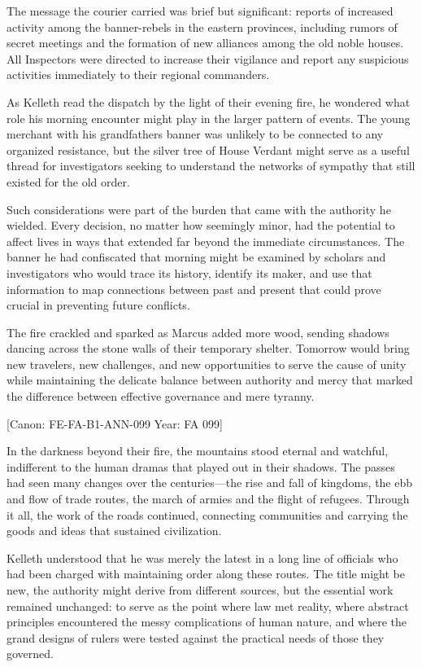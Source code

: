 The message the courier carried was brief but significant: reports of
increased activity among the banner-rebels in the eastern provinces,
including rumors of secret meetings and the formation of new alliances
among the old noble houses. All Inspectors were directed to increase
their vigilance and report any suspicious activities immediately to
their regional commanders.

As Kelleth read the dispatch by the light of their evening fire, he
wondered what role his morning encounter might play in the larger
pattern of events. The young merchant with his
grandfather\textquotesingle s banner was unlikely to be connected to any
organized resistance, but the silver tree of House Verdant might serve
as a useful thread for investigators seeking to understand the networks
of sympathy that still existed for the old order.

Such considerations were part of the burden that came with the authority
he wielded. Every decision, no matter how seemingly minor, had the
potential to affect lives in ways that extended far beyond the immediate
circumstances. The banner he had confiscated that morning might be
examined by scholars and investigators who would trace its history,
identify its maker, and use that information to map connections between
past and present that could prove crucial in preventing future
conflicts.

The fire crackled and sparked as Marcus added more wood, sending shadows
dancing across the stone walls of their temporary shelter. Tomorrow
would bring new travelers, new challenges, and new opportunities to
serve the cause of unity while maintaining the delicate balance between
authority and mercy that marked the difference between effective
governance and mere tyranny.

{[}Canon: FE-FA-B1-ANN-099 \textbar{} Year: FA 099{]}

In the darkness beyond their fire, the mountains stood eternal and
watchful, indifferent to the human dramas that played out in their
shadows. The passes had seen many changes over the centuries---the rise
and fall of kingdoms, the ebb and flow of trade routes, the march of
armies and the flight of refugees. Through it all, the work of the roads
continued, connecting communities and carrying the goods and ideas that
sustained civilization.

Kelleth understood that he was merely the latest in a long line of
officials who had been charged with maintaining order along these
routes. The title might be new, the authority might derive from
different sources, but the essential work remained unchanged: to serve
as the point where law met reality, where abstract principles
encountered the messy complications of human nature, and where the grand
designs of rulers were tested against the practical needs of those they
governed.

